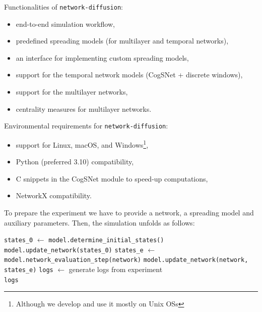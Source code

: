 \documentclass{beamer}
\begin{document}
\begin{frame}{\secname}
    Functionalities of \lstinline[style=py]{network-diffusion}:
    \vspace{1em}
    \begin{itemize}
        \item end-to-end simulation workflow,
        \item predefined spreading models (for multilayer and temporal networks),
        \item an interface for implementing custom spreading models,
        \item support for the temporal network models (CogSNet + discrete windows),
        \item support for the multilayer networks,
        \item centrality measures for multilayer networks.
    \end{itemize}
\end{frame}

\begin{frame}{\secname}
    Environmental requirements for \lstinline[style=py]{network-diffusion}:
    \vspace{1em}
    \begin{itemize}
        \item support for Linux, macOS, and Windows\footnote{Although we develop and use it mostly on Unix OSs},
        \item Python (preferred 3.10) compatibility,
        \item C snippets in the CogSNet module to speed-up computations,
        \item NetworkX compatibility.
    \end{itemize}
\end{frame}

\begin{frame}[fragile]{\secname}
    To prepare the experiment we have to provide a network, a spreading model and auxiliary parameters.
    Then, the simulation unfolds as follows:
    \begin{algorithmic}[1]
        \State \lstinline[style=py]{states_0} $\gets$ \lstinline[style=py]{model.determine_initial_states()}
        \State \lstinline[style=py]{model.update_network(states_0)} %
        \State \quad \quad \lstinline[style=py]{states_e} $\gets$ \lstinline[style=py]{model.network_evaluation_step(network)}
        \State \quad \quad \lstinline[style=py]{model.update_network(network, states_e)}
        \EndFor
        \State \lstinline[style=py]{logs} $\gets$ generate logs from experiment \\
        \Return \lstinline[style=py]{logs}
        \EndProcedure
    \end{algorithmic}
\end{frame}
\end{document}
